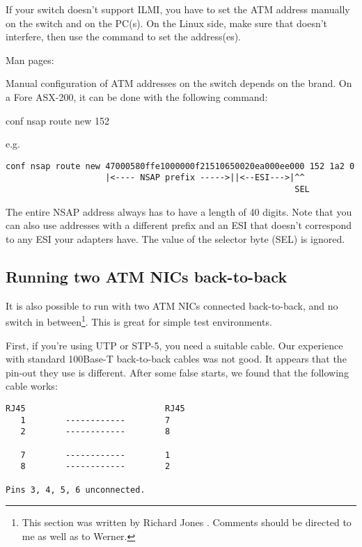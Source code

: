 If your switch doesn't support ILMI, you have to set the ATM address
manually on the switch and on the PC(s). On the Linux side, make sure that
 doesn't interfere, then use the  command to set
the address(es).

Man pages: 

Manual configuration of ATM addresses on the switch depends on the brand.
On a Fore ASX-200, it can be done with the following command:

\begin{command}
conf nsap route new  152  
\end{command}

e.g.

{\footnotesize
\begin{verbatim}
conf nsap route new 47000580ffe1000000f21510650020ea000ee000 152 1a2 0
                    |<---- NSAP prefix ----->||<--ESI--->|^^
                                                          SEL
\end{verbatim}}

The entire NSAP address always has to have a length of 40 digits.
Note that you can also use addresses with a different prefix and an ESI
that doesn't correspond to any ESI your adapters have. The value of the
selector byte (SEL) is ignored.


\subsection{Running two ATM NICs back-to-back}

It is also possible to run with two ATM NICs connected back-to-back,
and no switch in between\footnote{This section was written by
Richard Jones . Comments should be directed to me as well
as to Werner.}. This is great for simple test environments.

First, if you're using UTP or STP-5, you need a suitable cable.  Our
experience with standard 100Base-T back-to-back cables was not
good. It appears that the pin-out they use is different. After some
false starts, we found that the following cable works:

\begin{verbatim}
RJ45                            RJ45
   1        ------------        7
   2        ------------        8

   7        ------------        1
   8        ------------        2

Pins 3, 4, 5, 6 unconnected.
\end{verbatim}

